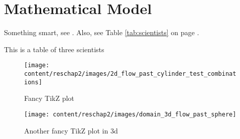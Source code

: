 \section{Mathematical Model}
Something smart, see \cite{EmmitBrown1947}. Also, see Table \ref{tab:scientists} on page \pageref{tab:scientists}.

\Blindtext

\begin{table}[p]
  \centering
  \caption{This is a table of three scientists}
  \label{tab:scientists}
\end{table}

\begin{figure}[p]
 \centering
 \texttt{[image: content/reschap2/images/2d\_flow\_past\_cylinder\_test\_combinations]}
 \caption{Fancy TikZ plot}
 \label{fig:test_combinations}
\end{figure}
\begin{figure}[p]
 \centering
 \texttt{[image: content/reschap2/images/domain\_3d\_flow\_past\_sphere]}
 \caption{Another fancy TikZ plot in 3d}
 \label{fig:3dgraphic}
\end{figure}
